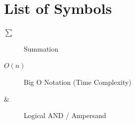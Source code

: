 \chapter*{List of Symbols}
\begin{description}
    \item[$\sum$] Summation
    \item[$O(n)$] Big O Notation (Time Complexity)
    \item[$\&$] Logical AND / Ampersand
\end{description}
